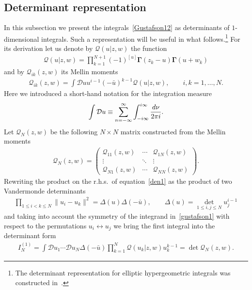 \documentclass[11pt]{article}
\numberwithin{equation}{section}
\numberwithin{equation}{section}
\begin{document}
\subsection{Determinant representation}\label{subsec:det}

In this subsection we present the integrals~\eqref{Gustafson12} as determinants of $1$-dimensional integrals. Such a representation will be useful in what follows.\footnote{The determinant representation for elliptic hypergeometric integrals was constructed in~\cite{RainSpiridonov}.} For its derivation let us denote by $\mathcal Q (u|z,w)$ the function
\begin{gather*}%
\mathcal Q (u|z,w)={\prod_{k=1}^{N+1}(-1)^{[u]}\boldsymbol\Gamma(z_k-u)\boldsymbol\Gamma(u+w_k)}
\end{gather*}
and by ${\mathcal{Q}}_{ik}(z,w)$ its Mellin moments
\begin{gather}\label{MellinQ}
{\mathcal{Q}}_{ik}(z,w)=\int \mathcal Du u^{i-1} (-\bar u)^{k-1} \mathcal Q (u|z,w), \qquad i,k=1,\ldots,N.
\end{gather}
Here we introduced a short-hand notation for the integration measure
\begin{gather*}
\int\mathcal Du\equiv
\sum_{n=-\infty}^{\infty}\int_{-{\rm i}\infty}^{{\rm i}\infty}\frac{{\rm d}\nu}{2\pi {\rm i}} .
\end{gather*}
Let $\boldsymbol{\mathcal Q}_N(z,w)$ be the following $N\times N$ matrix constructed from the Mellin moments
 \begin{gather}\label{Q-matrix}
\boldsymbol{\mathcal Q}_N(z,w)=\begin{pmatrix}
{\mathcal{Q}}_{11}(z,w)&\cdots& {\mathcal{Q}}_{1N}(z,w)
\\
\vdots & \ddots &\vdots
\\
{\mathcal{Q}}_{N1}(z,w)&\cdots& {\mathcal{Q}}_{NN}(z,w)
\end{pmatrix}.
\end{gather}
Rewriting the product on the r.h.s.\ of equation~\eqref{den1} as the product of two Vandermonde determinants
\begin{gather*}
\prod_{1\leq i<k\leq N}\|u_i-u_k\|^2=\Delta(u) \Delta (-\bar u), \qquad \Delta(u)=\det_{1\leq i,j\leq N} u_j^{i-1}
\end{gather*}
and taking into account the symmetry of the integrand in~\eqref{gustafson1} with respect to the permutations $u_i\leftrightarrow u_j$ we bring the first integral into the determinant form
\begin{gather}\label{det-rep-1}
I_N^{(1)} =\int\mathcal Du_1\cdots \mathcal Du_N \Delta(-\bar u) \prod_{k=1}^N \mathcal Q (u_k|z,w) u_k^{k-1}=\det \boldsymbol{\mathcal Q}_N(z,w).
\end{gather}
\end{document}
